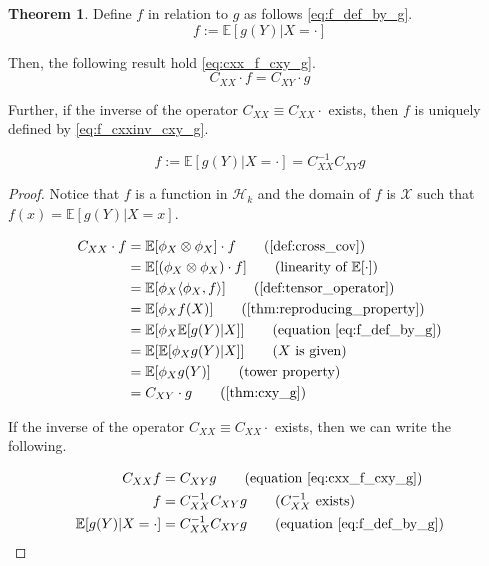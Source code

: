 \documentclass[twoside]{article} \usepackage{aistats2017}
\theoremstyle{definition}
\newtheorem{theorem}{Theorem}[section]
\newcommand{\rv}[1]{{#1}}
\newcommand{\expect}[1]{{\mathbb{E}[#1]}}
\newcommand{\inner}[2]{{\langle #1, #2 \rangle}}
\newcommand{\phiX}{\phi_{\rv{X}}}
\newcommand{\Cxy}{C_{\rv{X} \rv{Y}}}
\newcommand{\Cxx}{C_{\rv{X} \rv{X}}}
\begin{document}
		\begin{theorem} \label{thm:cxx_f_cxy_g}
			Define $f$ in relation to $g$ as follows \eqref{eq:f_def_by_g}.
			\begin{equation}
				f := \expect{g(Y) | X = \cdot}
			\label{eq:f_def_by_g}
			\end{equation}
			
			Then, the following result hold \eqref{eq:cxx_f_cxy_g}.
			\begin{equation}
				\Cxx \cdot f = \Cxy \cdot g
			\label{eq:cxx_f_cxy_g}
			\end{equation}
			
			Further, if the inverse of the operator $\Cxx \equiv \Cxx \cdot$ exists, then $f$ is uniquely defined by \eqref{eq:f_cxxinv_cxy_g}.
			
			\begin{equation}
				f := \expect{g(\rv{Y}) | \rv{X} = \cdot} = \Cxx^{-1} \Cxy g
			\label{eq:f_cxxinv_cxy_g}
			\end{equation}
	
			\begin{proof}
			Notice that $f$ is a function in $\mathcal{H}_{k}$ and the domain of $f$ is $\mathcal{X}$ such that $f(x) = \expect{g(\rv{Y}) | \rv{X} = x}$.
			
			\begin{align*}
				\Cxx \cdot f &= \expect{\phiX \otimes \phiX} \cdot f \tag{\cref{def:cross_cov}} \\
				&= \expect{(\phiX \otimes \phiX) \cdot f} \tag{linearity of $\expect{\cdot}$} \\
				&= \expect{\phiX \inner{\phiX}{f}} \tag{\cref{def:tensor_operator}} \\
				&= \expect{\phiX f(\rv{X})} \tag{\cref{thm:reproducing_property}} \\
				&= \expect{\phiX \expect{g(\rv{Y}) | \rv{X}}} \tag{equation \eqref{eq:f_def_by_g}} \\
				&= \expect{\expect{\phiX g(\rv{Y}) | \rv{X}}} \tag{$\rv{X}$ is given} \\
				&= \expect{\phiX g(\rv{Y})} \tag{tower property} \\
				&= \Cxy \cdot g \tag{\cref{thm:cxy_g}}
			\end{align*}
			
			If the inverse of the operator $\Cxx \equiv \Cxx \cdot$ exists, then we can write the following.
			
			\begin{align*}
				\Cxx f &= \Cxy g \tag{equation \eqref{eq:cxx_f_cxy_g}} \\
				f &= \Cxx^{-1} \Cxy g \tag{$\Cxx^{-1}$ exists} \\
				\expect{g(\rv{Y}) | \rv{X} = \cdot} &= \Cxx^{-1} \Cxy g \tag{equation \eqref{eq:f_def_by_g}}
			\end{align*}
			
			\end{proof}
		\end{theorem}
	
\end{document}
